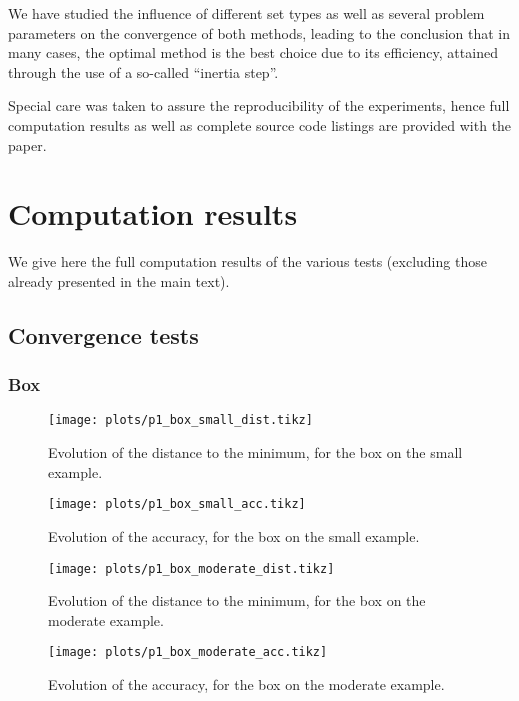 \documentclass[final]{aomart}
\newtheorem[{}\it]{thm}{Theorem}[section]
\theoremstyle{definition}
\newtheorem*[{}\it]{notation}{Notation}
\numberwithin{equation}{section}
\begin{document}
We have studied the influence of different set types as well as several problem parameters on the convergence of both methods, leading to the conclusion that in many cases, the optimal method is the best choice due to its efficiency, attained through the use of a so-called ``inertia step''.

Special care was taken to assure the reproducibility of the experiments, hence full computation results as well as complete source code listings are provided with the paper.




\appendix

\section{Computation results}
\label{sec:full}
We give here the full computation results of the various tests (excluding those already presented in the main text).

\subsection{Convergence tests}
\subsubsection{Box}
\begin{figure}[H]
	\centering
	\texttt{[image: plots/p1\_box\_small\_dist.tikz]}
	\caption{Evolution of the distance to the minimum, for the box on the small example.}
	\label{fig:app_box_small_dist}
\end{figure}

\begin{figure}[H]
	\centering
	\texttt{[image: plots/p1\_box\_small\_acc.tikz]}
	\caption{Evolution of the accuracy, for the box on the small example.}
	\label{fig:app_box_small_acc}
\end{figure}

\begin{figure}[H]
	\centering
	\texttt{[image: plots/p1\_box\_moderate\_dist.tikz]}
	\caption{Evolution of the distance to the minimum, for the box on the moderate example.}
	\label{fig:app_box_moderate_dist}
\end{figure}

\begin{figure}[H]
	\centering
	\texttt{[image: plots/p1\_box\_moderate\_acc.tikz]}
	\caption{Evolution of the accuracy, for the box on the moderate example.}
	\label{fig:app_box_moderate_acc}
\end{figure}
\end{document}
